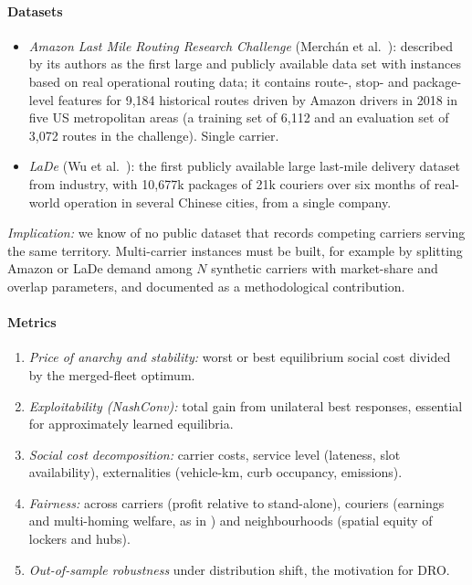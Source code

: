 \documentclass[preprint,12pt]{elsarticle}
\begin{document}
\paragraph{Datasets}
\begin{itemize}[leftmargin=*]
\item \emph{Amazon Last Mile Routing Research Challenge} (Merch{\'a}n et al.\ \cite{Merchan2024}): described by its authors as the first large and publicly available data set with instances based on real operational routing data; it contains route-, stop- and package-level features for 9,184 historical routes driven by Amazon drivers in 2018 in five US metropolitan areas (a training set of 6,112 and an evaluation set of 3,072 routes in the challenge). Single carrier.
\item \emph{LaDe} (Wu et al.\ \cite{Wu2024}): the first publicly available large last-mile delivery dataset from industry, with 10,677k packages of 21k couriers over six months of real-world operation in several Chinese cities, from a single company.
\end{itemize}
\emph{Implication:} we know of no public dataset that records competing carriers serving the same territory. Multi-carrier instances must be built, for example by splitting Amazon or LaDe demand among $N$ synthetic carriers with market-share and overlap parameters, and documented as a methodological contribution.

\paragraph{Metrics}
\begin{enumerate}[leftmargin=*]
\item \emph{Price of anarchy and stability:} worst or best equilibrium social cost divided by the merged-fleet optimum.
\item \emph{Exploitability (NashConv):} total gain from unilateral best responses, essential for approximately learned equilibria.
\item \emph{Social cost decomposition:} carrier costs, service level (lateness, slot availability), externalities (vehicle-km, curb occupancy, emissions).
\item \emph{Fairness:} across carriers (profit relative to stand-alone), couriers (earnings and multi-homing welfare, as in \cite{Benjaafar2022,Alnaggar2024}) and neighbourhoods (spatial equity of lockers and hubs).
\item \emph{Out-of-sample robustness} under distribution shift, the motivation for DRO.
\end{enumerate}
\end{document}
